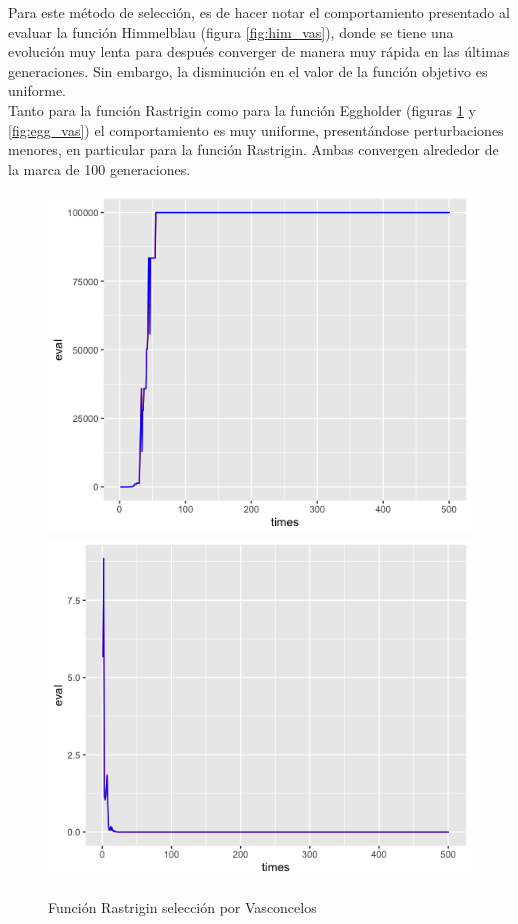 \documentclass[letterpaper,12pt]{article}
\theoremstyle{definition}
\begin{document}
Para este método de selección, es de hacer notar el comportamiento presentado al evaluar la función Himmelblau (figura \ref{fig:him_vas}), donde se tiene una evolución muy lenta para después converger de manera muy rápida en las últimas generaciones. Sin embargo, la disminución en el valor de la función objetivo es uniforme.\\

Tanto para la función Rastrigin como para la función Eggholder (figuras \ref{fig:rast_vas} y \ref{fig:egg_vas}) el comportamiento es muy uniforme, presentándose perturbaciones menores, en particular para la función Rastrigin. Ambas convergen alrededor de la marca de 100 generaciones.


\begin{figure}[H]
    \includegraphics[width=\linewidth]{rast_vas_fitness}
  \endminipage\hfill
    \includegraphics[width=\linewidth]{rast_vas_eval}
  \endminipage\hfill
  \caption{Función Rastrigin selección por Vasconcelos}
  \label{fig:rast_vas}
\end{figure}
\end{document}
